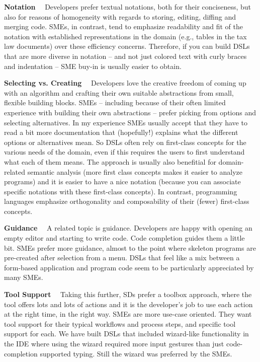 \documentclass[runningheads]{llncs}
\newcommand\parhead[1]{\vspace{1mm}\noindent\textbf{{#1}}\ \ }
\begin{document}
\parhead{Notation} Developers prefer textual notations, both for their
conciseness, but also for reasons of homogeneity with regards to storing,
editing, diffing and merging code. SMEs, in contrast, tend to emphasize
readability and fit of the notation with established representations in the
domain (e.g., tables in the tax law documents) over these efficiency concerns.
Therefore, if you can build DSLs that are more diverse in notation -- and not
just colored text with curly braces and indentation -- SME buy-in is usually
easier to obtain.

\parhead{Selecting vs. Creating} Developers love the creative freedom of coming
up with an algorithm and crafting their own suitable abstractions from small,
flexible building blocks. SMEs -- including because of their often limited
experience with building their own abstractions -- prefer picking from options
and selecting alternatives.
In my experience SMEs usually accept that they have to read a bit more documentation that
(hopefully!) explains what the different options or alternatives mean.
So DSLs often rely on first-class concepts for the various needs of the domain,
even if this requires the users to first understand what each of them means.
The approach is usually also benefitial for domain-related semantic analysis
(more first class concepts makes it easier to analyze programs) and it is easier
to have a nice notation (because you can associate specific notations with these
first-class concepts). In contrast, programming languages emphasize
orthogonality and composability of their (fewer) first-class concepts.

\parhead{Guidance} A related topic is guidance. Developers are happy with
opening an empty editor and starting to write code. Code completion guides
them a little bit. SMEs prefer more guidance, almost to the point where 
skeleton programs are pre-created after selection from a menu. DSLs that feel
like a mix between a form-based application and program code seem to be 
particularly appreciated by many SMEs. 

\parhead{Tool Support} Taking this further, SDs prefer a toolbox approach, where
the tool offers lots and lots of actions and it is the
developer's job to use each action at the right time, in the right way.
SMEs are more use-case oriented. They want tool support for their typical
workflows and process steps, and specific tool support for each. We have built DSLs that
included wizard-like functionality in the IDE where using the wizard required
more input gestures than just code-completion supported typing. Still the wizard
was preferred by the SMEs.
 
\end{document}

